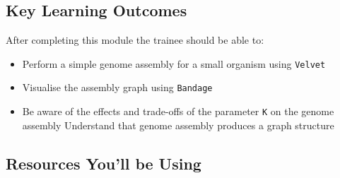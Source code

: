 
\chapter{\moduleTitle}
\newpage


\section{Key Learning Outcomes}

After completing this module the trainee should be able to:
\begin{itemize}
  \item Perform a simple genome assembly for a small organism using \texttt{Velvet}
  \item Visualise the assembly graph using \texttt{Bandage}
  \item Be aware of the effects and trade-offs of the parameter \texttt{K} on the genome assembly
  \teim Understand that genome assembly produces a graph structure
\end{itemize}

\section{Resources You'll be Using}
 
